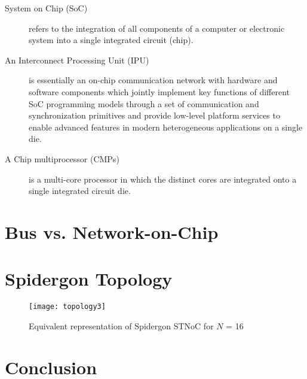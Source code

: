 \begin{description}

\item[System on Chip (SoC)] 
	refers to the integration of all components of a computer or electronic system into a single integrated circuit (chip).\cite{wikiSoC}
	
\item[An Interconnect Processing Unit (IPU)] 
	is essentially an on-chip communication network with hardware and software components which jointly implement key functions of different SoC programming models through a set of communication and synchronization primitives and provide low-level platform services to enable advanced features in modern heterogeneous applications on a single die.\cite{coppola2008design}

\item[A Chip multiprocessor (CMPs)] is a multi-core processor in which the distinct cores are integrated onto a single integrated circuit die.

\end{description}

\section{Bus vs. Network-on-Chip}\label{C:busvsnoc}

\section{Spidergon Topology}\label{C:topology}
	\begin{figure}[ht]
	\centering
		\texttt{[image: topology3]}
		\caption{Equivalent representation of Spidergon STNoC for ${N}$ = 16}
		\label{fig: topology}
	\end{figure}

\section{Conclusion}\label{S:conclusion}
	\todo






